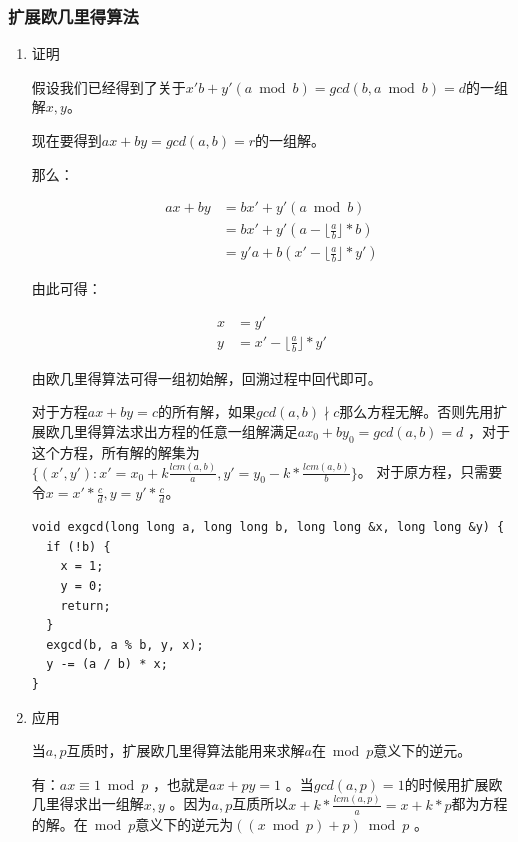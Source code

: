 \documentclass[11pt]{article}
\begin{document}
\subsubsection{扩展欧几里得算法}
\label{sec-1-1-4}
\begin{enumerate}
\item 证明
\label{sec-1-1-4-1}

假设我们已经得到了关于\(x'b+y'(a \bmod b)=gcd(b,a \bmod b)=d\)的一组解\(x,y\)。

现在要得到\(ax+by=gcd(a,b)=r\)的一组解。

那么：

$$
\begin{aligned}
a x + b y &= b x' + y' (a \bmod b)\\
&= bx' + y'(a - \lfloor \frac{a}{b} \rfloor * b) \\
&= y'a + b(x' - \lfloor \frac{a}{b} \rfloor*y')
\end{aligned}
$$

由此可得：

$$
\begin{aligned}
x &= y'\\
y &= x' - \lfloor \frac{a}{b} \rfloor * y'
\end{aligned}
$$

由欧几里得算法可得一组初始解，回溯过程中回代即可。

对于方程\(ax+by=c\)的所有解，如果\(gcd(a,b) \nmid c\)那么方程无解。否则先用扩展欧几里得算法求出方程的任意一组解满足\(ax_0+by_0=gcd(a,b)=d\) ，对于这个方程，所有解的解集为\(\{(x',y'): x' = x_0 + k \frac{lcm(a,b)}{a}, y'=y_0-k*\frac{lcm(a,b)}{b}\}\)。 对于原方程，只需要令\(x=x'*\frac{c}{d},y=y'*\frac{c}{d}\)。 

\begin{verbatim}
void exgcd(long long a, long long b, long long &x, long long &y) {
  if (!b) {
    x = 1;
    y = 0;
    return;
  }
  exgcd(b, a % b, y, x);
  y -= (a / b) * x;
}
\end{verbatim}

\item 应用
\label{sec-1-1-4-2}

当\(a, p\)互质时，扩展欧几里得算法能用来求解\(a\)在\(\bmod p\)意义下的逆元。

有：\(ax \equiv 1 \bmod p\) ，也就是\(ax + py = 1\) 。当\(gcd(a,p)=1\)的时候用扩展欧几里得求出一组解\(x,y\) 。因为\(a,p\)互质所以\(x+k* \frac{lcm(a,p)}{a} = x + k * p\)都为方程的解。在\(\bmod p\)意义下的逆元为\(((x \bmod p) + p) \bmod p\) 。
\end{enumerate}
\end{document}
